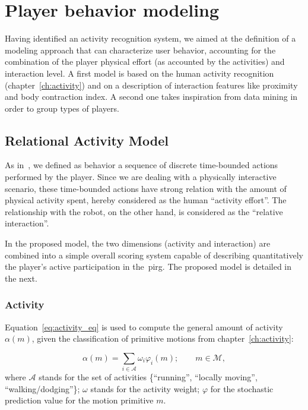 \chapter{Player behavior modeling}\label{ch:modeling}

Having identified an activity recognition system, we aimed at the definition of a modeling approach that can characterize user behavior, accounting for the combination of the player physical effort (as accounted by the activities) and interaction level. A first model is based on the human activity recognition (chapter~\ref{ch:activity}) and on a description of interaction features like proximity and body contraction index. A second one takes inspiration from data mining in order to group types of players.

\section{Relational Activity Model}\label{sec:simple_model}

As in~\cite{etheredge_generic_2013}, we defined as behavior a sequence of discrete time-bounded actions performed by the player. Since we are dealing with a physically interactive scenario, these time-bounded actions have strong relation with the amount of physical activity spent, hereby considered as the human ``activity effort''. The relationship with the robot, on the other hand, is considered as the ``relative interaction''. 

In the proposed model, the two dimensions (activity and interaction) are combined into a simple overall scoring system capable of describing quantitatively the player's active participation in the~\gls{pirg}. The proposed model is detailed in the next.

\subsection{Activity}\label{activity}

Equation~\ref{eq:activity_eq} is used to compute the general amount of activity $\alpha(m)$, given the classification of primitive motions from chapter~\ref{ch:activity}:

\begin{equation}
	\alpha(m)=\sum_{i \in \mathcal{A}} \omega_{i}\varphi_i(m);\qquad m \in \mathcal{M},
	\label{eq:activity_eq}
\end{equation}
where $\mathcal{A}$ stands for the set of activities \{``running'', ``locally moving'', ``walking/dodging''\}; $\omega$ stands for the activity weight; $\varphi$ for the stochastic prediction value for the motion primitive $m$.

